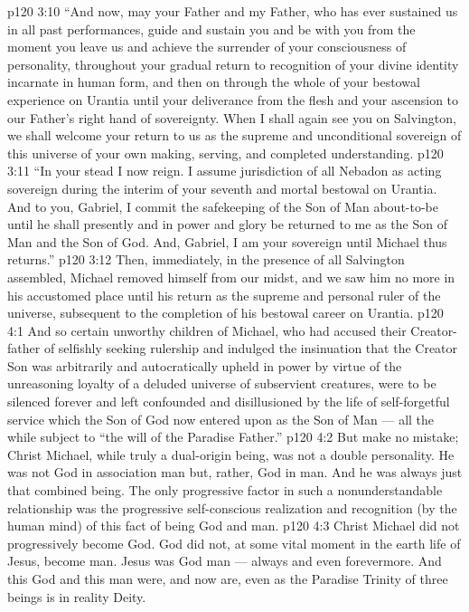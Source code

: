 \vs p120 3:10 “And now, may your Father and my Father, who has ever sustained us in all past performances, guide and sustain you and be with you from the moment you leave us and achieve the surrender of your consciousness of personality, throughout your gradual return to recognition of your divine identity incarnate in human form, and then on through the whole of your bestowal experience on Urantia until your deliverance from the flesh and your ascension to our Father’s right hand of sovereignty. When I shall again see you on Salvington, we shall welcome your return to us as the supreme and unconditional sovereign of this universe of your own making, serving, and completed understanding.
\vs p120 3:11 “In your stead I now reign. I assume jurisdiction of all Nebadon as acting sovereign during the interim of your seventh and mortal bestowal on Urantia. And to you, Gabriel, I commit the safekeeping of the Son of Man about\hyp{}to\hyp{}be until he shall presently and in power and glory be returned to me as the Son of Man and the Son of God. And, Gabriel, I am your sovereign until Michael thus returns.”
\separatorline
\vs p120 3:12 Then, immediately, in the presence of all Salvington assembled, Michael removed himself from our midst, and we saw him no more in his accustomed place until his return as the supreme and personal ruler of the universe, subsequent to the completion of his bestowal career on Urantia.
\vs p120 4:1 And so certain unworthy children of Michael, who had accused their Creator\hyp{}father of selfishly seeking rulership and indulged the insinuation that the Creator Son was arbitrarily and autocratically upheld in power by virtue of the unreasoning loyalty of a deluded universe of subservient creatures, were to be silenced forever and left confounded and disillusioned by the life of self\hyp{}forgetful service which the Son of God now entered upon as the Son of Man --- all the while subject to “the will of the Paradise Father.”
\vs p120 4:2 \pc But make no mistake; Christ Michael, while truly a dual\hyp{}origin being, was not a double personality. He was not God in association  man but, rather, God  in man. And he was always just that combined being. The only progressive factor in such a nonunderstandable relationship was the progressive self\hyp{}conscious realization and recognition (by the human mind) of this fact of being God and man.
\vs p120 4:3 Christ Michael did not progressively become God. God did not, at some vital moment in the earth life of Jesus, become man. Jesus was God  man --- always and even forevermore. And this God and this man were, and now are,  even as the Paradise Trinity of three beings is in reality  Deity.
